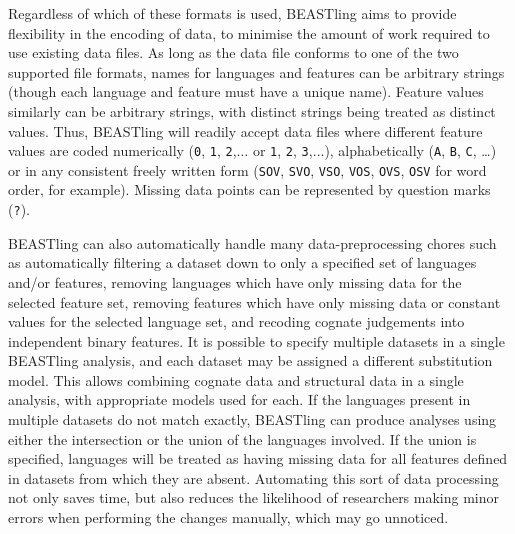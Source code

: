 \documentclass[10pt,a4paper]{article}
\begin{document}
Regardless of which of these formats is used, BEASTling aims to provide flexibility in the encoding of data, to minimise the amount of work required to use existing data files.  As long as the data file conforms to one of the two supported file formats, names for languages and features can be arbitrary strings (though each language and feature must have a unique name).  Feature values similarly can be arbitrary strings, with distinct strings being treated as distinct values.  Thus, BEASTling will readily accept data files where different feature values are coded numerically (\texttt{0}, \texttt{1}, \texttt{2},$\ldots$ or \texttt{1}, \texttt{2}, \texttt{3},$\ldots$), alphabetically (\texttt{A}, \texttt{B}, \texttt{C}, \ldots) or in any consistent freely written form (\texttt{SOV}, \texttt{SVO}, \texttt{VSO}, \texttt{VOS}, \texttt{OVS}, \texttt{OSV} for word order, for example).  Missing data points can be represented by question marks (\texttt{?}).

BEASTling can also automatically handle many data-preprocessing chores such as automatically filtering a dataset down to only a specified set of languages and/or features, removing languages which have only missing data for the selected feature set, removing features which have only missing data or constant values for the selected language set, and recoding cognate judgements into independent binary features.  It is possible to specify multiple datasets in a single BEASTling analysis, and each dataset may be assigned a different substitution model.  This allows combining cognate data and structural data in a single analysis, with appropriate models used for each.  If the languages present in multiple datasets do not match exactly, BEASTling can produce analyses using either the intersection or the union of the languages involved.  If the union is specified, languages will be treated as having missing data for all features defined in datasets from which they are absent.  Automating this sort of data processing not only saves time, but also reduces the likelihood of researchers making minor errors when performing the changes manually, which may go unnoticed.
\end{document}
